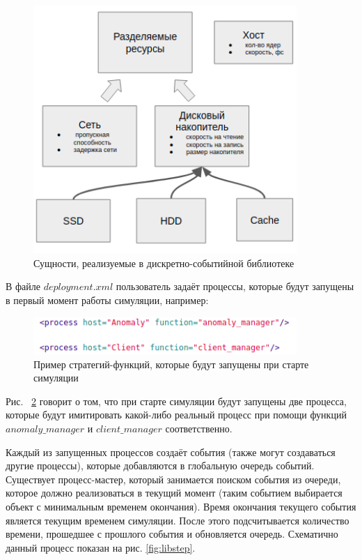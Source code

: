 \begin{figure}[!ht]
\centering
\includegraphics[width=10cm]{Kenenbek/images/libmodel.png}
\caption{Сущности, реализуемые в дискретно-событийной библиотеке}
\label{fig:libmodel}
\end{figure}

В файле $deployment.xml$ пользователь задаёт процессы, которые будут запущены в первый момент работы симуляции, например:

\begin{figure}[!ht]
\centering
\includegraphics[width=10cm]{Kenenbek/images/deployfunc.png}
\caption{Пример стратегий-функций, которые будут запущены при старте симуляции}
\label{fig:deployfunc}
\end{figure}

Рис. ~\ref{fig:deployfunc} говорит о том, что при старте симуляции будут запущены две процесса, которые будут имитировать какой-либо реальный процесс при помощи функций $anomaly\_manager$ и $client\_manager$ соответственно. 

\par 
Каждый из запущенных процессов создаёт события (также могут создаваться другие процессы), которые добавляются в глобальную очередь событий. Существует процесс-мастер, который занимается поиском события из очереди, которое должно реализоваться в текущий момент (таким событием выбирается объект с минимальным временем окончания). Время окончания текущего события является текущим временем симуляции. После этого подсчитывается количество времени, прошедшее с прошлого события и обновляется очередь. Схематично данный процесс показан на рис. \ref{fig:libstep}.
 
